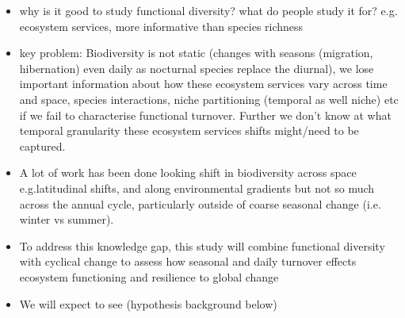 \documentclass[11pt]{report}
\begin{document}
\begin{itemize}
\item why is it good to study functional diversity? what do people study it for? e.g. ecosystem services, more informative than species richness
\item key problem: Biodiversity is not static (changes with seasons (migration, hibernation) even daily as nocturnal species replace the diurnal), we lose important information about how these ecosystem services vary across time and space, species interactions, niche partitioning (temporal as well niche) etc if we fail to characterise functional turnover. Further we don't know at what temporal granularity these ecosystem services shifts might/need to be captured.
 \item A lot of work has been done looking shift in biodiversity across space e.g.latitudinal shifts, and along environmental gradients but not so much across the annual cycle, particularly outside of coarse seasonal change (i.e. winter vs summer). 
\item To address this knowledge gap, this study will combine functional diversity with cyclical change to assess how seasonal and daily turnover effects ecosystem functioning and resilience to global change 
\item We will expect to see (hypothesis background below)
\end{itemize}

\noindent
\end{document}
